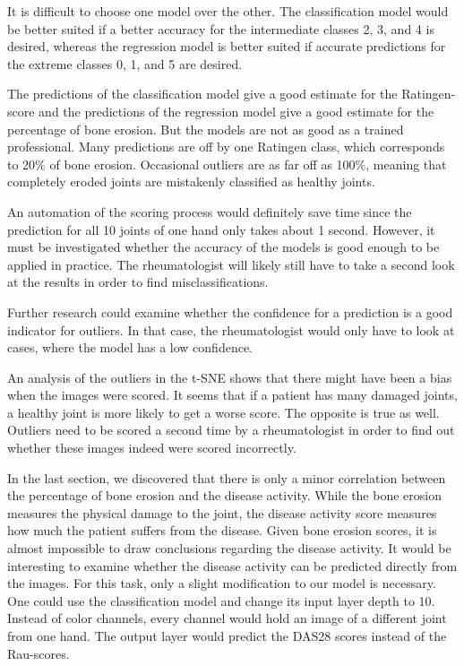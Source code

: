 \documentclass[12pt]{article}
\begin{document}
It is difficult to choose one model over the other. The classification model would be better suited if a better accuracy for the intermediate classes 2, 3, and 4 is desired, whereas the regression model is better suited if accurate predictions for the extreme classes 0, 1, and 5 are desired.

The predictions of the classification model give a good estimate for the Ratingen-score and the predictions of the regression model give a good estimate for the percentage of bone erosion. But the models are not as good as a trained professional. Many predictions are off by one Ratingen class, which corresponds to 20\% of bone erosion. Occasional outliers are as far off as 100\%, meaning that completely eroded joints are mistakenly classified as healthy joints. 

An automation of the scoring process would definitely save time since the prediction for all 10 joints of one hand only takes about 1 second. However, it must be investigated whether the accuracy of the models is good enough to be applied in practice. The rheumatologist will likely still have to take a second look at the results in order to find misclassifications.

Further research could examine whether the confidence for a prediction is a good indicator for outliers. In that case, the rheumatologist would only have to look at cases, where the model has a low confidence.

An analysis of the outliers in the t-SNE shows that there might have been a bias when the images were scored. It seems that if a patient has many damaged joints, a healthy joint is more likely to get a worse score. The opposite is true as well. Outliers need to be scored a second time by a rheumatologist in order to find out whether these images indeed were scored incorrectly.

In the last section, we discovered that there is only a minor correlation between the percentage of bone erosion and the disease activity. While the bone erosion measures the physical damage to the joint, the disease activity score measures how much the patient suffers from the disease. Given bone erosion scores, it is almost impossible to draw conclusions regarding the disease activity. It would be interesting to examine whether the disease activity can be predicted directly from the images. For this task, only a slight modification to our model is necessary. One could use the classification model and change its input layer depth to 10. Instead of color channels, every channel would hold an image of a different joint from one hand. The output layer would predict the DAS28 scores instead of the Rau-scores.
\end{document}
